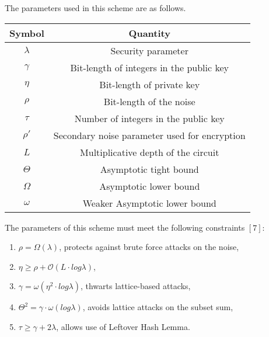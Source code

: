 \documentclass[../../main.tex]{subfiles}
\begin{document}
The parameters used in this scheme are as follows. 

\begin{center}
\begin{tabular}{ |c|c| } 
 \hline
 \bf{Symbol} & \bf{Quantity} \\
 \hline
 $\lambda$ & Security parameter \\
 \hline
 $\gamma$ & Bit-length of integers in the public key \\
 \hline
 $\eta$ & Bit-length of private key \\ 
 \hline
 $\rho$ & Bit-length of the noise \\ 
 \hline
 $\tau$ & Number of integers in the public key \\
 \hline
 $\rho'$ & Secondary noise parameter used for encryption \\
 \hline 
 $L$ & Multiplicative depth of the circuit \\
 \hline
 $\Theta$ & Asymptotic tight bound \\
 \hline
 $\Omega$ & Asymptotic lower bound \\
 \hline
 $\omega$ & Weaker Asymptotic lower bound \\
 \hline
\end{tabular}
\end{center}

\noindent The parameters of this scheme must meet the following constraints $[7]$:

\begin{enumerate}
    \item $\rho = \Omega(\lambda)$, protects against brute force attacks on the noise,
    \item $\eta \geq \rho + \mathcal{O}(L \cdot log \lambda)$,
    \item $\gamma = \omega(\eta^2 \cdot log\lambda)$, thwarts lattice-based attacks,
    \item $\Theta^2 = \gamma \cdot \omega(log \lambda)$, avoids lattice attacks on the subset sum,
    \item $\tau \geq \gamma + 2\lambda$, allows use of Leftover Hash Lemma.
\end{enumerate}
\end{document}
